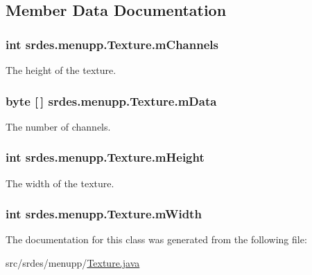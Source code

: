 \subsection{\-Member \-Data \-Documentation}
\hypertarget{classsrdes_1_1menupp_1_1_texture_af84573ecaeec54fe307aa1958eec2727}{
\subsubsection[{m\-Channels}]{\setlength{\rightskip}{0pt plus 5cm}int {\bf srdes.\-menupp.\-Texture.\-m\-Channels}}}\label{classsrdes_1_1menupp_1_1_texture_af84573ecaeec54fe307aa1958eec2727}


\-The height of the texture. 

\hypertarget{classsrdes_1_1menupp_1_1_texture_a9e705e4b34593939d4827502c6ded591}{
\subsubsection[{m\-Data}]{\setlength{\rightskip}{0pt plus 5cm}byte \mbox{[}$\,$\mbox{]} {\bf srdes.\-menupp.\-Texture.\-m\-Data}}}\label{classsrdes_1_1menupp_1_1_texture_a9e705e4b34593939d4827502c6ded591}


\-The number of channels. 

\hypertarget{classsrdes_1_1menupp_1_1_texture_a6843fe62cf39bb8fe17ba56da1ab754b}{
\subsubsection[{m\-Height}]{\setlength{\rightskip}{0pt plus 5cm}int {\bf srdes.\-menupp.\-Texture.\-m\-Height}}}\label{classsrdes_1_1menupp_1_1_texture_a6843fe62cf39bb8fe17ba56da1ab754b}


\-The width of the texture. 

\hypertarget{classsrdes_1_1menupp_1_1_texture_a7bae8644a8a005c53dd95211e5147346}{
\subsubsection[{m\-Width}]{\setlength{\rightskip}{0pt plus 5cm}int {\bf srdes.\-menupp.\-Texture.\-m\-Width}}}\label{classsrdes_1_1menupp_1_1_texture_a7bae8644a8a005c53dd95211e5147346}


\-The documentation for this class was generated from the following file\-:\begin{DoxyCompactItemize}
\item 
src/srdes/menupp/\hyperlink{_texture_8java}{\-Texture.\-java}\end{DoxyCompactItemize}
